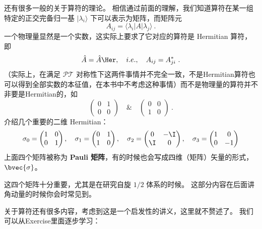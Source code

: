 还有很多一般的关于算符的理论。 相信通过前面的理解，我们知道算符在某一组特定的正交完备归一基 $|\lambda_i\rangle$ 下可以表示为矩阵，而矩阵元
\begin{equation}
A_{ij} = \langle\lambda_i|A|\lambda_j\rangle~.
\end{equation}
一个物理量显然是一个实数，这实际上要求了它对应的算符是 Hermitian 算符，即
\begin{equation}
\hat{A} = \hat{A}\Her,\quad i.e.,\quad A_{ij} = A_{ji}^*~.
\end{equation}
（实际上，在满足 $\mathcal{PT}$ 对称性下这两件事情并不完全一致，不是Hermitian算符也可以得到全部实数的本征值，在本书中不考虑这种事情）而不是物理量的算符并不非要是Hermitian的，如
\begin{equation}
\left(\begin{matrix}0 & 1\\0 & 0\end{matrix}\right) \quad \& \quad \left(\begin{matrix}0 & 0\\1 & 0\end{matrix}\right)~.
\end{equation}
介绍几个重要的二维 Hermitian：
\begin{equation}\label{eq_Basics_18}
\sigma_0 = \left(\begin{matrix}1 & 0\\0 & 1\end{matrix}\right),
\quad\sigma_1 = \left(\begin{matrix} 0 & 1\\1 & 0\end{matrix}\right),
\quad\sigma_2 = \left(\begin{matrix} 0 & -\I\\ \I & 0\end{matrix}\right),
\quad\sigma_3 = \left(\begin{matrix} 1 & 0\\0 & -1\end{matrix}\right)  
\end{equation}
上面四个矩阵被称为 \textbf{Pauli 矩阵}，有的时候也会写成四维（矩阵）矢量的形式，$\bvec{\sigma}$。

这四个矩阵十分重要，尤其是在研究自旋 $1/2$ 体系的时候。 这部分内容在后面讲角动量的时候你会时常见到。

关于算符还有很多内容，考虑到这是一个启发性的讲义，这里就不赘述了。 我们可以从Exercise里面逐步学习：

